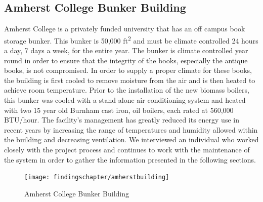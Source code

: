 \subsection{Amherst College Bunker Building}
\par Amherst College is a privately funded university that has an off campus book storage bunker. This bunker is 50,000 ft\textsuperscript{2} and must be climate controlled 24 hours a day, 7 days a week, for the entire year. The bunker is climate controlled year round in order to ensure that the integrity of the books, especially the antique books, is not compromised. In order to supply a proper climate for these books, the building is first cooled to remove moisture from the air and is then heated to achieve room temperature. Prior to the installation of the new biomass boilers, this bunker was cooled with a stand alone air conditioning system and heated with two 15 year old Burnham cast iron, oil boilers, each rated at 560,000 BTU/hour. The facility’s management has greatly reduced its energy use in recent years by increasing the range of temperatures and humidity allowed within the building and decreasing ventilation. We interviewed an individual who worked closely with the project process and continues to work with the maintenance of the system in order to gather the information presented in the following sections.
\begin{figure}[H]
\centering
\texttt{[image: findingschapter/amherstbuilding]}
\caption{Amherst College Bunker Building}
\end{figure}

